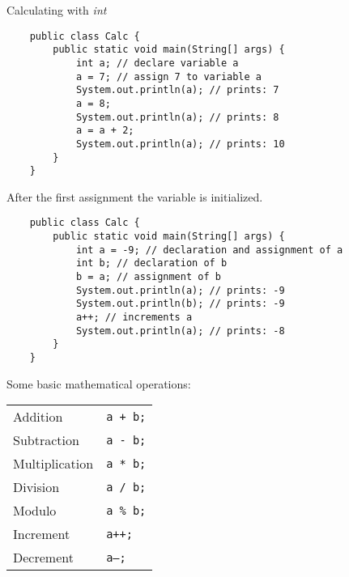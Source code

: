 \begin{frame}{Calculating with \emph{int}}
	\begin{lstlisting}
	public class Calc {
	    public static void main(String[] args) {
	        int a; // declare variable a
	        a = 7; // assign 7 to variable a
	        System.out.println(a); // prints: 7
	        a = 8;
	        System.out.println(a); // prints: 8
	        a = a + 2;
	        System.out.println(a); // prints: 10
	    }
	}
	\end{lstlisting}
	After the first assignment the variable is initialized.
\framebreak
	\begin{lstlisting}
	public class Calc {
	    public static void main(String[] args) {
	        int a = -9; // declaration and assignment of a
	        int b; // declaration of b
	        b = a; // assignment of b
	        System.out.println(a); // prints: -9
	        System.out.println(b); // prints: -9
	        a++; // increments a
	        System.out.println(a); // prints: -8
	    }
	}
	\end{lstlisting}

\framebreak
	Some basic mathematical operations:
	\begin{tabular}{ll}
		Addition & \texttt{a + b;} \\
		Subtraction & \texttt{a - b;} \\
		Multiplication &\texttt{a * b;} \\
		Division & \texttt{a / b;} \\
		Modulo & \texttt{a \% b;} \\
		Increment & \texttt{a++;} \\
		Decrement & \texttt{a--;} \\
	\end{tabular}
\end{frame}

